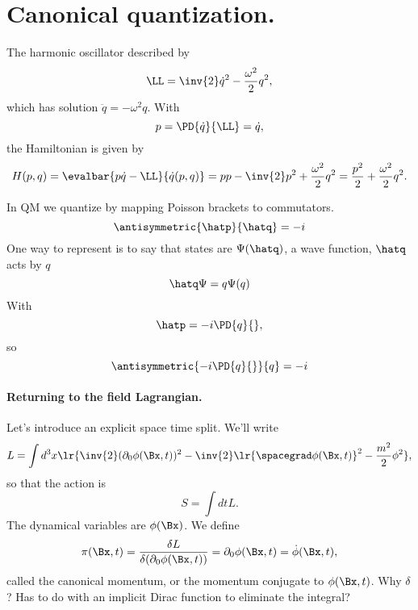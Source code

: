 %
%
\section{Canonical quantization.}

The harmonic oscillator described by
\begin{dmath}\label{eqn:qftLecture4:740}
\LL = \inv{2} \dot{q}^2 - \frac{\omega^2}{2} q^2,
\end{dmath}
which has solution \(\ddot{q} = - \omega^2 q\).
With
\begin{equation}\label{eqn:qftLecture4:760}
p = \PD{\dot{q}}{\LL} = \dot{q},
\end{equation}
the Hamiltonian is given by
\begin{dmath}\label{eqn:qftLecture4:780}
H(p,q) = \evalbar{p \dot{q} - \LL}{\dot{q}(p, q)}
= p p - \inv{2} p^2 + \frac{\omega^2}{2} q^2 = \frac{p^2}{2} + \frac{\omega^2}{2} q^2.
\end{dmath}

In QM we quantize by mapping Poisson brackets to commutators.
\begin{dmath}\label{eqn:qftLecture4:800}
\antisymmetric{\hatp}{\hatq} = -i
\end{dmath}
One way to represent is to say that states are \( \Psi(\hatq) \), a wave function, \( \hatq \) acts by \( q \)
\begin{dmath}\label{eqn:qftLecture4:820}
\hatq \Psi = q \Psi(q)
\end{dmath}
With
\begin{dmath}\label{eqn:qftLecture4:840}
\hatp = -i \PD{q}{},
\end{dmath}
so
\begin{dmath}\label{eqn:qftLecture4:860}
\antisymmetric{ -i \PD{q}{} } { q} = -i
\end{dmath}

\paragraph{Returning to the field Lagrangian.}

Let's introduce an explicit space time split.  We'll write
\begin{dmath}\label{eqn:qftLecture4:880}
L = \int d^3 x \lr{
\inv{2} (\partial_0 \phi(\Bx, t))^2 - \inv{2} \lr{ \spacegrad \phi(\Bx, t) }^2 - \frac{m^2}{2} \phi^2
},
\end{dmath}
so that the action is
\begin{dmath}\label{eqn:qftLecture4:900}
S = \int dt L.
\end{dmath}
The dynamical variables are \( \phi(\Bx) \).  We define
\begin{dmath}\label{eqn:qftLecture4:920}
\pi(\Bx, t) = \frac{\delta L}{\delta (\partial_0 \phi(\Bx, t))}
=
\partial_0 \phi(\Bx, t)
=
\dot{\phi}(\Bx, t),
\end{dmath}
called the canonical momentum, or the momentum conjugate to \( \phi(\Bx, t) \).
Why \( \delta \)?  Has to do with an implicit Dirac function to eliminate the integral?

